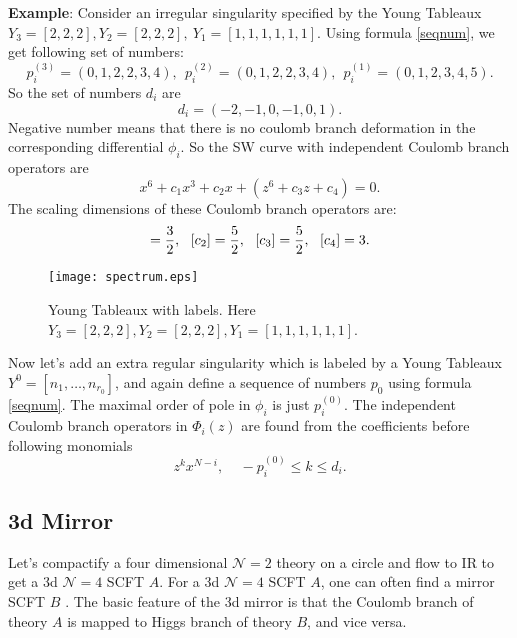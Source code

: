 \documentclass[a4paper,11pt]{article}
\begin{document}
\textbf{Example}: Consider an irregular singularity specified by the Young Tableaux $Y_3=[2,2,2], Y_2=[2,2,2],~Y_1=[1,1,1,1,1,1]$.  Using formula \ref{seqnum}, we get following set of numbers:
\begin{equation}
p_i^{(3)}=(0,1,2,2,3,4),~~p_i^{(2)}=(0,1,2,2,3,4),~~p_i^{(1)}=(0,1,2,3,4,5).
\end{equation}
So the set of numbers $d_i$ are 
\begin{equation}
d_i=(-2,-1,0,-1,0,1).
\end{equation}
Negative number means that there is no coulomb branch deformation in the corresponding differential $\phi_i$. So the SW curve with independent Coulomb branch operators are 
\begin{equation}
x^6+ c_1 x^3+ c_2 x+ (z^6+c_3 z+c_4)=0. 
\end{equation}
The scaling dimensions of these Coulomb branch operators are:
\begin{equation}
[c_1]={3\over 2},~~[c_2]={5\over 2},~~[c_3]={5\over2},~~[c_4]=3.
\end{equation}
\begin{figure}[h]
\centering
  \texttt{[image: spectrum.eps]}
  \caption{Young Tableaux with labels. Here $Y_3=[2,2,2],Y_2=[2,2,2], Y_1=[1,1,1,1,1,1]$.}
  \label{young}
\end{figure}

Now let's add an extra regular singularity which is labeled by a Young Tableaux $Y^0=[n_1,\ldots, n_{r_0}]$, and again define a sequence of numbers  $p_0$
using formula \ref{seqnum}. The maximal order of pole in $\phi_i$ is just $p_i^{(0)}$.  The independent Coulomb branch operators in $\Phi_i(z)$ are found from the 
coefficients before following monomials
\begin{equation}
 z^k x^{N-i},~~~~~-p_i^{(0)}\leq k\leq d_i. 
\end{equation}

\subsection{3d Mirror}
Let's compactify a  four dimensional $\mathcal{N}=2$ theory on a circle and flow to IR to get a 3d $\mathcal{N}=4$ SCFT $A$. For 
a 3d $\mathcal{N}=4$ SCFT $A$, one can often find a mirror SCFT $B$ \cite{Intriligator:1996ex}. The basic feature of the 3d mirror is that the Coulomb branch of 
theory $A$ is mapped to Higgs branch of theory $B$, and vice versa.    
\end{document}
